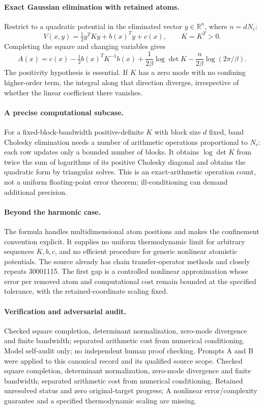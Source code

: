 \documentclass[11pt]{article}
\begin{document}
\paragraph{Exact Gaussian elimination with retained atoms.} Restrict to a quadratic potential in the eliminated vector $y\in\mathbb R^n$, where $n=dN_c$:
\[
 V(x,y)=\tfrac12y^TKy+b(x)^Ty+c(x),\qquad K=K^T>0.
\]
Completing the square and changing variables gives
\[
 A(x)=c(x)-\tfrac12b(x)^TK^{-1}b(x)
 +\frac1{2\beta}\log\det K-\frac n{2\beta}\log(2\pi/\beta).
\]
The positivity hypothesis is essential. If $K$ has a zero mode with no confining higher-order term, the integral along that direction diverges, irrespective of whether the linear coefficient there vanishes.

\paragraph{A precise computational subcase.} For a fixed-block-bandwidth positive-definite $K$ with block size $d$ fixed, band Cholesky elimination needs a number of arithmetic operations proportional to $N_c$: each row updates only a bounded number of blocks. It obtains $\log\det K$ from twice the sum of logarithms of its positive Cholesky diagonal and obtains the quadratic form by triangular solves. This is an exact-arithmetic operation count, not a uniform floating-point error theorem; ill-conditioning can demand additional precision.

\paragraph{Beyond the harmonic case.} The formula handles multidimensional atom positions and makes the confinement convention explicit. It supplies no uniform thermodynamic limit for arbitrary sequences $K,b,c$, and no efficient procedure for generic nonlinear atomistic potentials. The source already has chain transfer-operator methods and closely repeats 30001115. The first gap is a controlled nonlinear approximation whose error per removed atom and computational cost remain bounded at the specified tolerance, with the retained-coordinate scaling fixed.

\paragraph{Verification and adversarial audit.}
Checked square completion, determinant normalization, zero-mode divergence and finite bandwidth; separated arithmetic cost from numerical conditioning. Model self-audit only; no independent human proof checking. Prompts A and B were applied to this canonical record and its qualified source scope. Checked square completion, determinant normalization, zero-mode divergence and finite bandwidth; separated arithmetic cost from numerical conditioning. Retained unresolved status and zero original-target progress; A nonlinear error/complexity guarantee and a specified thermodynamic scaling are missing.
\end{document}
